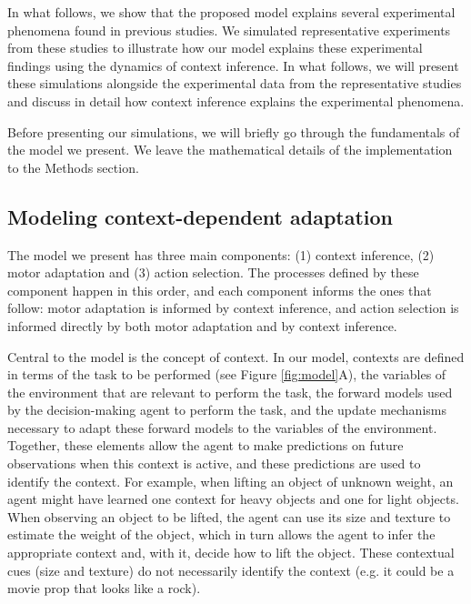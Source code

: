 \documentclass[a4paper,doc,floatsintext,natbib]{apa6}
\def \fref #1{Figure \ref{#1}}     %
\begin{document}
In what follows, we show that the proposed model explains several experimental phenomena found in previous studies. We simulated representative experiments from these studies to illustrate how our model explains these experimental findings using the dynamics of context inference. In what follows, we will present these simulations alongside the experimental data from the representative studies and discuss in detail how context inference explains the experimental phenomena.

Before presenting our simulations, we will briefly go through the fundamentals of the model we present. We leave the mathematical details of the implementation to the Methods section.

\subsection{Modeling context-dependent adaptation}
The model we present has three main components: (1) context inference, (2) motor adaptation and (3) action selection. The processes defined by these component happen in this order, and each component informs the ones that follow: motor adaptation is informed by context inference, and action selection is informed directly by both motor adaptation and by context inference.

Central to the model is the concept of context. In our model, contexts are defined in terms of the task to be performed (see \fref{fig:model}A), the variables of the environment that are relevant to perform the task, the forward models used by the decision-making agent to perform the task, and the update mechanisms necessary to adapt these forward models to the variables of the environment. Together, these elements allow the agent to make predictions on future observations when this context is active, and these predictions are used to identify the context. For example, when lifting an object of unknown weight, an agent might have learned one context for heavy objects and one for light objects. When observing an object to be lifted, the agent can use its size and texture to estimate the weight of the object, which in turn allows the agent to infer the appropriate context and, with it, decide how to lift the object. These contextual cues (size and texture) do not necessarily identify the context (e.g. it could be a movie prop that looks like a rock).
\end{document}
